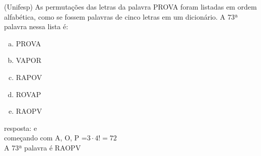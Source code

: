 \begin{ex}
 (Unifesp) As permutações das letras da palavra PROVA foram listadas em ordem alfabética, como se fossem palavras de cinco letras em um dicionário. A 73ª palavra nessa lista é:
    \begin{enumerate}[(a)]
    \item PROVA
    \item VAPOR
    \item RAPOV
    \item ROVAP
    \item RAOPV
    \end{enumerate}
     \begin{sol}
     resposta: e \\
     começando com A, O, P =$3\cdot4!=72$ \\
     A 73ª palavra é RAOPV
     \end{sol}
\end{ex}